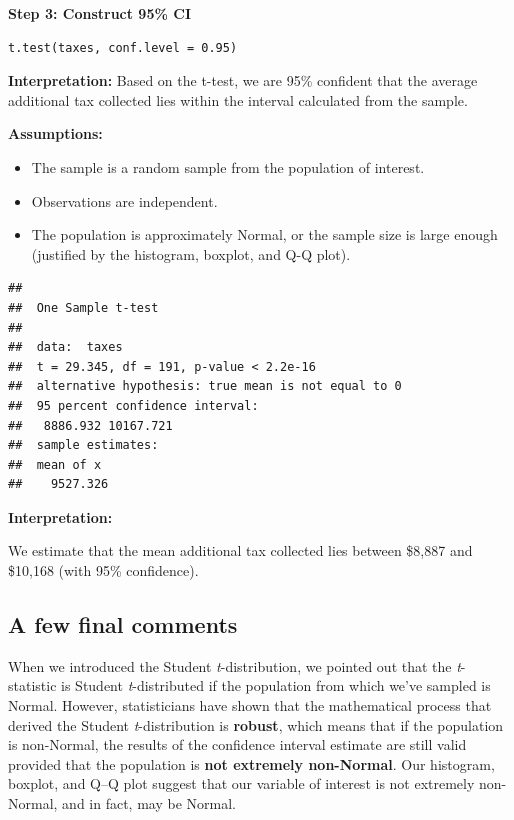 \begin{example}
\vspace{1em}
\textbf{Step 3: Construct 95\% CI}

\begin{tcolorbox}[colback=gray!10, colframe=black!45, arc=2mm]

\begin{verbatim}
t.test(taxes, conf.level = 0.95)
\end{verbatim}
\end{tcolorbox}

\vspace{0.5em}
\textbf{Interpretation:} Based on the t-test, we are 95\% confident that the average additional tax collected lies within the interval calculated from the sample.

\textbf{Assumptions:}
\begin{itemize}
  \item The sample is a random sample from the population of interest.
  \item Observations are independent.
  \item The population is approximately Normal, or the sample size is large enough (justified by the histogram, boxplot, and Q-Q plot).
\end{itemize}

\begin{tcolorbox}[colback=gray!10, colframe=black!45, arc=2mm]


\begin{verbatim}
## 
##  One Sample t-test
## 
##  data:  taxes
##  t = 29.345, df = 191, p-value < 2.2e-16
##  alternative hypothesis: true mean is not equal to 0
##  95 percent confidence interval:
##   8886.932 10167.721
##  sample estimates:
##  mean of x 
##    9527.326 
\end{verbatim}
\end{tcolorbox}

\bigskip

\textbf{Interpretation:}

We estimate that the mean additional tax collected lies between \$8,887 and \$10,168 (with 95\% confidence).
\end{example}
\subsection*{A few final comments}

When we introduced the Student \emph{t}-distribution, we pointed out that the \emph{t}-statistic is Student \emph{t}-distributed if the population from which we’ve sampled is Normal. However, statisticians have shown that the mathematical process that derived the Student \emph{t}-distribution is \textbf{robust}, which means that if the population is non-Normal, the results of the confidence interval estimate are still valid provided that the population is \textbf{not extremely non-Normal}. Our histogram, boxplot, and Q--Q plot suggest that our variable of interest is not extremely non-Normal, and in fact, may be Normal.


